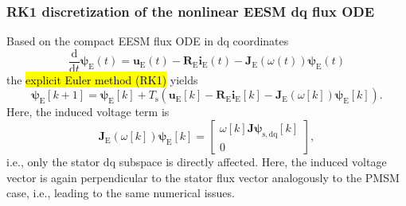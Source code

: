 \begin{frame}
    \frametitle{RK1 discretization of the nonlinear EESM dq flux ODE}
    Based on the compact EESM flux ODE in dq coordinates
    \begin{equation*}
        \frac{\mathrm{d}}{\mathrm{d}t}\bm{\psi}_\mathrm{E}(t) = \bm{u}_\mathrm{E}(t) - \bm{R}_\mathrm{E}\bm{i}_\mathrm{E}(t) - \bm{J}_\mathrm{E}(\omega(t))\bm{\psi}_\mathrm{E}(t)
    \end{equation*}\pause%
    the \hl{explicit Euler method (RK1)} yields
    \begin{equation}
        \bm{\psi}_\mathrm{E}[k+1] = \bm{\psi}_\mathrm{E}[k] + T_\mathrm{s}\left(\bm{u}_\mathrm{E}[k] - \bm{R}_\mathrm{E}\bm{i}_\mathrm{E}[k] - \bm{J}_\mathrm{E}(\omega[k])\bm{\psi}_\mathrm{E}[k]\right).
        \label{eq:RK1_dq_flux_linkage_EESM}
    \end{equation}\pause%
    Here, the induced voltage term is
    \begin{equation*}
        \bm{J}_\mathrm{E}(\omega[k])\bm{\psi}_\mathrm{E}[k] = \begin{bmatrix}
            \omega[k]\bm{J}\bm{\psi}_\mathrm{s,dq}[k] \\
            0
        \end{bmatrix},
    \end{equation*}
    i.e., only the stator $\mathrm{dq}$ subspace is directly affected. Here, the induced voltage vector is again perpendicular to the stator flux vector analogously to the PMSM case, i.e., leading to the same numerical issues.
\end{frame}

